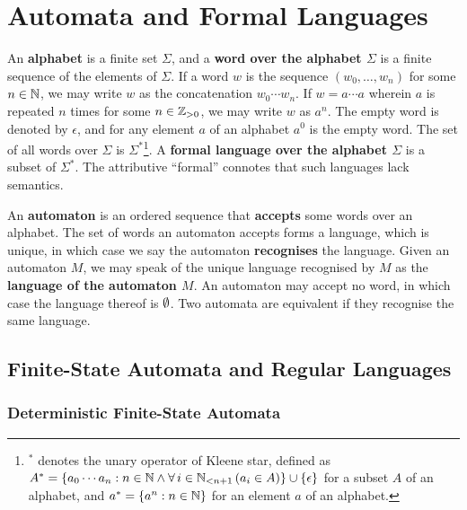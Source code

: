 


\usepackage{tikz}
\usetikzlibrary{automata,decorations.markings}
\newcommand*{\pt}{5mm}
\newcommand*{\lemautorefname}{Lemma}
\newcommand*{\thmautorefname}{Theorem}


\section{Automata and Formal Languages}

An {\bf alphabet} is a finite set \(\Sigma\), and a {\bf word over the alphabet
\(\Sigma\)} is a finite sequence of the elements of \(\Sigma\). If a word \(w\)
is the sequence \((w_0, \ldots, w_n)\) for some \(n \in \setnat\), we may write
\(w\) as the concatenation \(w_0 \cdots w_n\). If \(w = a \cdots a\) wherein
\(a\) is repeated \(n\) times for some \(n \in \posint\), we may write \(w\) as
\(a^n\). The empty word is denoted by \(\epsilon\), and for any element \(a\) of
an alphabet \(a^0\) is the empty word. The set of all words over \(\Sigma\) is
\(\Sigma^*\)\footnote{\(^*\) denotes the unary operator of Kleene star, defined
as \(A^* = \set{a_0 \cdots a_n : n \in \setnat \land \forall \, i \in \Nln[n +
1] \, (a_i \in A)} \cup \set{\epsilon}\) for a subset \(A\) of an alphabet, and
\(a^* = \set{a^n : n \in \setnat}\) for an element \(a\) of an alphabet.}. A
{\bf formal language over the alphabet \(\Sigma\)} is a subset of \(\Sigma^*\).
The attributive ``formal'' connotes that such languages lack semantics.

An {\bf automaton} is an ordered sequence that {\bf accepts} some words over an
alphabet. The set of words an automaton accepts forms a language, which is
unique, in which case we say the automaton {\bf recognises} the language. Given
an automaton \(M\), we may speak of the unique language recognised by \(M\) as
the {\bf language of the automaton \(M\)}. An automaton may accept no word, in
which case the language thereof is \(\nset\). Two automata are equivalent if
they recognise the same language.

\subsection{Finite-State Automata and Regular Languages}

\subsubsection{Deterministic Finite-State Automata}

